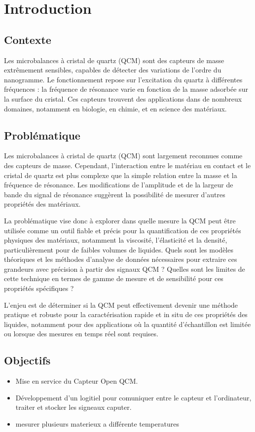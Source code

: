 \chapter{Introduction}

\section{Contexte}

Les microbalances à cristal de quartz (QCM) sont des capteurs de masse extrêmement sensibles, capables de détecter des variations de l’ordre du nanogramme. 
Le fonctionnement repose sur l’excitation du quartz à différentes fréquences : la fréquence de résonance varie en fonction de la masse adsorbée sur la surface du cristal. 
Ces capteurs trouvent des applications dans de nombreux domaines, notamment en biologie, en chimie, et en science des matériaux.

\section{Problématique}
Les microbalances à cristal de quartz (QCM) sont largement reconnues comme des capteurs de masse. Cependant, 
l'interaction entre le matériau en contact et le cristal de quartz est plus complexe que la simple relation entre la masse et la fréquence de résonance. 
Les modifications de l'amplitude et de la largeur de bande du signal de résonance suggèrent la possibilité de mesurer d'autres propriétés des matériaux.

La problématique vise donc à explorer dans quelle mesure la QCM peut être utilisée comme un outil fiable et précis pour la quantification de ces propriétés physiques des matériaux, 
notamment la viscosité, l'élasticité et la densité, 
particulièrement pour de faibles volumes de liquides. 
Quels sont les modèles théoriques et les méthodes d'analyse de données nécessaires pour extraire ces grandeurs avec précision à partir des signaux QCM ? 
Quelles sont les limites de cette technique en termes de gamme de mesure et de sensibilité pour ces propriétés spécifiques ?

L'enjeu est de déterminer si la QCM peut effectivement devenir une méthode pratique et robuste pour la caractérisation rapide et in situ de ces propriétés des liquides, 
notamment pour des applications où la quantité d'échantillon est limitée ou lorsque des mesures en temps réel sont requises.

\section{Objectifs}
\begin{itemize}
    \item Mise en service du Capteur Open QCM.
    \item Développement d'un logitiel pour comuniquer entre le capteur et l'ordinateur, traiter et stocker les signeaux caputer.
    \item mesurer plusieurs materieux a différente temperatures

\end{itemize}

